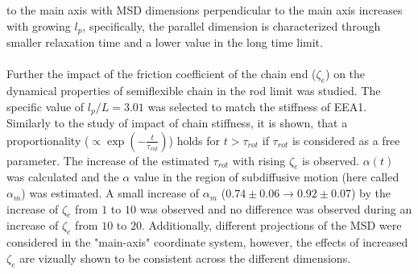 \documentclass[
    paper=A4,pagesize=automedia,fontsize=12pt,
    BCOR=15mm,DIV=22,
    twoside,headinclude,footinclude=false,
    fleqn,             %
    bibliography=totocnumbered,          %
    listof=totoc,                %
    listof=flat,                 %
    cleardoublepage=empty      %
    numbers=endperiod
]{scrartcl}
\begin{document}
to the main axis with MSD dimensions perpendicular to the main axis 
increases with growing $l_p$, specifically, the parallel dimension is 
characterized through smaller relaxation time and a lower value in the long time limit.
\\
\\
Further the impact of the friction coefficient of the chain end ($\zeta_e$) 
on the dynamical properties of semiflexible chain in the rod limit was studied.
The specific value of $l_p/L=3.01$ was selected to match the stiffness of
EEA1. Similarly to the study of impact of chain stiffness, it is shown,
that a proportionality ($\propto \exp\left(-\frac{t}{\tau_{rot}}\right)$) holds
for $t>\tau_{rot}$ if $\tau_{rot}$ is considered as a free parameter.
The increase of the estimated $\tau_{rot}$ with rising $\zeta_e$ is observed.
$\alpha(t)$ was calculated and the $\alpha$ value in the region of subdiffusive motion
(here called $\alpha_m$) was estimated. A small
increase of $\alpha_m$
($0.74 \pm 0.06 \rightarrow 0.92 \pm 0.07$) by the 
increase of $\zeta_e$ from $1$ to $10$ was observed and no difference was observed
during an increase of $\zeta_e$ from $10$ to $20$. Additionally, different projections
of the MSD were considered in the "main-axis" coordinate system, however, the effects of 
increased $\zeta_e$ are vizually shown to be consistent across the different dimensions.
\end{document}
